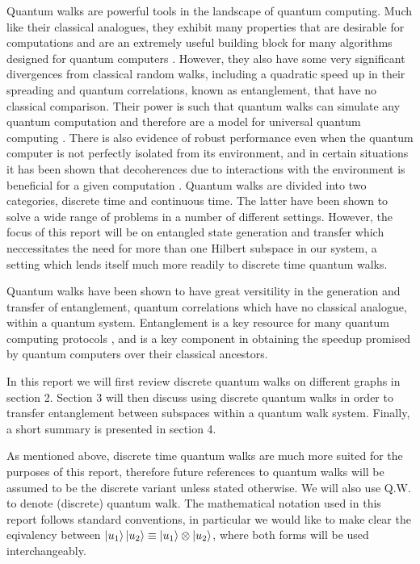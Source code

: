 Quantum walks are powerful tools in the landscape of quantum computing. 
Much like their classical analogues, they exhibit many properties that are desirable for computations and are an extremely useful building block for many algorithms designed for quantum computers \cite{shenvi2003}. 
However, they also have some very significant divergences from classical random walks, including a quadratic speed up in their spreading and quantum correlations, known as entanglement, that have no classical comparison. 
Their power is such that quantum walks can simulate any quantum computation and therefore are a model for universal quantum computing \cite{Childs_2009}.
There is also evidence of robust performance even when the quantum computer is not perfectly isolated from its environment, and in certain situations it has been shown that decoherences due to interactions with the environment is beneficial for a given computation \cite{KENDON_2007}. 
Quantum walks are divided into two categories, discrete time and continuous time. 
The latter have been shown to solve a wide range of problems in a number of different settings. 
However, the focus of this report will be on entangled state generation and transfer which neccessitates the need for more than one Hilbert subspace in our system, a setting which lends itself much more readily to discrete time quantum walks.\newline

Quantum walks have been shown to have great versitility in the generation and transfer of entanglement, quantum correlations which have no classical analogue, within a quantum system. 
Entanglement is a key resource for many quantum computing protocols \cite{qkd}\cite{Superdense}\cite{qteleport}, and is a key component in obtaining the speedup promised by quantum computers over their classical ancestors.\newline

In this report we will first review discrete quantum walks on different graphs in section 2. 
Section 3 will then discuss using discrete quantum walks in order to transfer entanglement between subspaces within a quantum walk system. 
Finally, a short summary is presented in section 4.\newline

As mentioned above, discrete time quantum walks are much more suited for the purposes of this report, therefore future references to quantum walks will be assumed to be the discrete variant unless stated otherwise. 
We will also use Q.W. to denote (discrete) quantum walk. 
The mathematical notation used in this report follows standard conventions, in particular we would like to make clear the eqivalency between $\ket{u_1}\ket{u_2} \equiv \ket{u_1} \otimes \ket{u_2}$, where both forms will be used interchangeably.